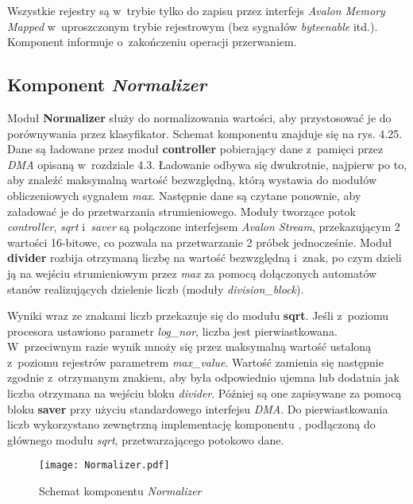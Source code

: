 Wszystkie rejestry są w~trybie tylko do zapisu przez interfejs \textit{Avalon Memory Mapped} w~uproszczonym trybie rejestrowym (bez sygnałów \textit{byteenable} itd.). Komponent informuje o~zakończeniu operacji przerwaniem.

\subsection{Komponent \textit{Normalizer}}
Moduł \textbf{Normalizer} służy do normalizowania wartości, aby przystosować je do porównywania przez klasyfikator. Schemat komponentu znajduje się na rys. 4.25. Dane są ładowane przez moduł \textbf{controller} pobierający dane z~pamięci przez \textit{DMA} opisaną w~rozdziale 4.3. Ładowanie odbywa się dwukrotnie, najpierw po to, aby znaleźć maksymalną wartość bezwzględną, którą wystawia do modułów obliczeniowych sygnałem \textit{max}. Następnie dane są czytane ponownie, aby załadować je do przetwarzania strumieniowego. Moduły tworzące potok \textit{controller}, \textit{sqrt} i~\textit{saver} są połączone interfejsem \textit{Avalon Stream}, przekazującym 2 wartości 16-bitowe, co pozwala na przetwarzanie 2 próbek jednocześnie. Moduł \textbf{divider} rozbija otrzymaną liczbę na wartość bezwzględną i~znak, po czym dzieli ją na wejściu strumieniowym przez \textit{max} za pomocą dołączonych automatów stanów realizujących dzielenie liczb (moduły \textit{division\_block}).

Wyniki wraz ze znakami liczb przekazuje się do modułu \textbf{sqrt}. Jeśli z~poziomu procesora ustawiono parametr \textit{log\_nor}, liczba jest pierwiastkowana. W~przeciwnym razie wynik mnoży się przez maksymalną wartość ustaloną z~poziomu rejestrów parametrem \textit{max\_value}. Wartość zamienia się następnie zgodnie z~otrzymanym znakiem, aby była odpowiednio ujemna lub dodatnia jak liczba otrzymana na wejściu bloku \textit{divider}. Później są one zapisywane za pomocą bloku \textbf{saver} przy użyciu standardowego interfejsu \textit{DMA}. Do pierwiastkowania liczb wykorzystano zewnętrzną implementację komponentu \cite{Sqrt}, podłączoną do głównego modułu \textit{sqrt}, przetwarzającego potokowo dane.

\begin{figure}[h]
	\centering
	\texttt{[image: Normalizer.pdf]}
	\caption{Schemat komponentu \textit{Normalizer}}
\end{figure}
\FloatBarrier %

